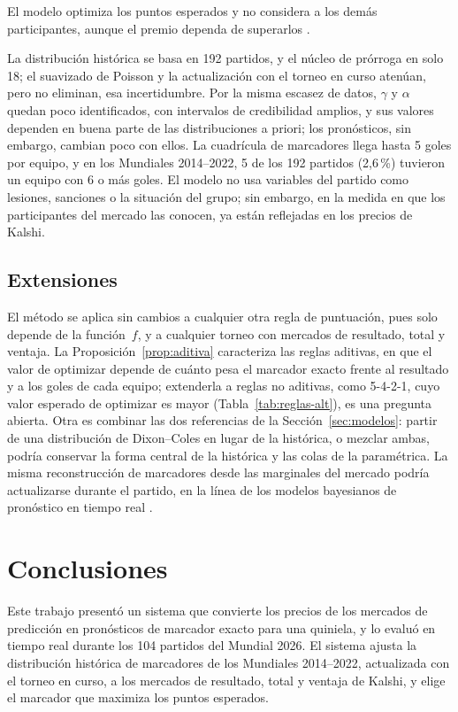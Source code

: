 \documentclass[12pt]{article}
\theoremstyle{plain}
\theoremstyle{remark}
\begin{document}
El modelo optimiza los puntos esperados y no considera a los demás
participantes, aunque el premio dependa de superarlos
\citep{clair2007}.

La distribución histórica se basa en 192 partidos, y el núcleo de
prórroga en solo 18; el suavizado de Poisson y la actualización con
el torneo en curso atenúan, pero no eliminan, esa incertidumbre.
Por la misma escasez de datos, $\gamma$ y $\alpha$ quedan poco
identificados, con intervalos de credibilidad amplios, y sus valores
dependen en buena parte de las distribuciones a priori; los
pronósticos, sin embargo, cambian poco con ellos.
La cuadrícula de marcadores llega hasta 5 goles por equipo, y en los
Mundiales 2014--2022, 5 de los 192 partidos (2,6\,\%) tuvieron un
equipo con 6 o más goles.
El modelo no usa variables del partido como lesiones, sanciones o la
situación del grupo; sin embargo, en la medida en que los
participantes del mercado las conocen, ya están reflejadas en los
precios de Kalshi.

\subsection{Extensiones}

El método se aplica sin cambios a cualquier otra regla de puntuación,
pues solo depende de la función~$f$, y a cualquier torneo con mercados
de resultado, total y ventaja.
La Proposición~\ref{prop:aditiva} caracteriza las reglas aditivas,
en que el valor de optimizar depende de cuánto pesa el marcador exacto
frente al resultado y a los goles de cada equipo; extenderla a reglas
no aditivas, como 5-4-2-1, cuyo valor esperado de optimizar es mayor
(Tabla~\ref{tab:reglas-alt}), es una pregunta abierta.
Otra es combinar las dos referencias de la Sección~\ref{sec:modelos}:
partir de una distribución de Dixon--Coles en lugar de la histórica,
o mezclar ambas, podría conservar la forma central de la histórica y
las colas de la paramétrica.
La misma reconstrucción de marcadores desde las marginales del mercado
podría actualizarse durante el partido, en la línea de los modelos
bayesianos de pronóstico en tiempo real \citep{divekar2024}.

\section{Conclusiones}
\label{sec:conclusiones}

Este trabajo presentó un sistema que convierte los precios de los
mercados de predicción en pronósticos de marcador exacto para una
quiniela, y lo evaluó en tiempo real durante los 104 partidos del
Mundial 2026.
El sistema ajusta la distribución histórica de marcadores de los
Mundiales 2014--2022, actualizada con el torneo en curso, a los
mercados de resultado, total y ventaja de Kalshi, y elige el marcador
que maximiza los puntos esperados.
\end{document}
